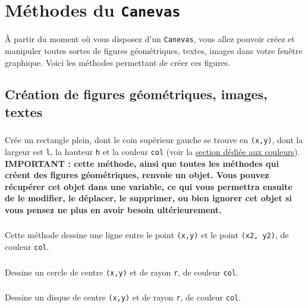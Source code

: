 \documentclass[11pt,a4paper]{article}
\begin{document}
\section{Méthodes du {\tt Canevas}}
\`A partir du moment où vous disposez d'un {\tt Canevas}, vous allez pouvoir créez et manipuler toutes sortes de figures géométriques, textes, images dans votre fenêtre graphique. Voici les méthodes permettant de créer ces figures.

\subsection*{Création de figures géométriques, images, textes}

\subsubsection*{}
Crée un rectangle plein, dont le coin supérieur gauche se trouve en {\tt (x,y)}, dont la largeur est {\tt l}, la hauteur {\tt h} et la couleur {\tt col} (voir la \underline{section dédiée aux couleurs}).\\

{\bf IMPORTANT : cette méthode, ainsi que toutes les méthodes qui créent des figures géométriques, renvoie un objet. Vous pouvez récupérer cet objet dans une variable, ce qui vous permettra ensuite de le modifier, le déplacer, le supprimer, ou bien ignorer cet objet si vous pensez ne plus en avoir besoin ultérieurement.}

\subsubsection*{}
Cette méthode dessine une ligne entre le point {\tt (x,y)} et le point {\tt (x2, y2)}, de couleur {\tt col}.

\subsubsection*{}
Dessine un cercle de centre {\tt (x,y)} et de rayon {\tt r}, de couleur {\tt col}.

\subsubsection*{}
Dessine un disque de centre {\tt (x,y)} et de rayon {\tt r}, de couleur {\tt col}.
\end{document}
